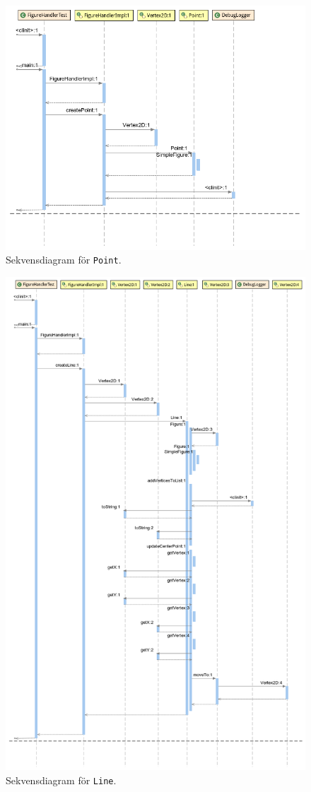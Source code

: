 \begin{figure}[ht]
\centering
\includegraphics[width=\linewidth]{diagram/figureHandlerTest_Point_Sequence-Diagram.png}
\caption{Sekvensdiagram för \texttt{Point}.
}
\label{fig:sekv-point}
\end{figure}

\begin{figure}[ht]
\centering
\includegraphics[width=0.8\linewidth]{diagram/figureHandlerTest_Line_Sequence-Diagram.png}
\caption{Sekvensdiagram för \texttt{Line}.
}
\label{fig:sekv-line}
\end{figure}


